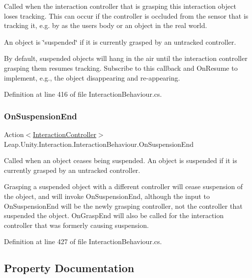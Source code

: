 Called when the interaction controller that is grasping this interaction object loses tracking. This can occur if the controller is occluded from the sensor that is tracking it, e.\+g. by as the user\textquotesingle{}s body or an object in the real world. 

An object is \char`\"{}suspended\char`\"{} if it is currently grasped by an untracked controller.

By default, suspended objects will hang in the air until the interaction controller grasping them resumes tracking. Subscribe to this callback and On\+Resume to implement, e.\+g., the object disappearing and re-\/appearing. 

Definition at line 416 of file Interaction\+Behaviour.\+cs.

\mbox{\label{class_leap_1_1_unity_1_1_interaction_1_1_interaction_behaviour_a3d34025a6b0a6f5c4160b2819aedae2d}} 
\subsubsection{\texorpdfstring{OnSuspensionEnd}{OnSuspensionEnd}}
{\footnotesize\ttfamily Action$<$\mbox{\hyperlink{class_leap_1_1_unity_1_1_interaction_1_1_interaction_controller}{Interaction\+Controller}}$>$ Leap.\+Unity.\+Interaction.\+Interaction\+Behaviour.\+On\+Suspension\+End}



Called when an object ceases being suspended. An object is suspended if it is currently grasped by an untracked controller. 

Grasping a suspended object with a different controller will cease suspension of the object, and will invoke On\+Suspension\+End, although the input to On\+Suspension\+End will be the newly grasping controller, not the controller that suspended the object. On\+Grasp\+End will also be called for the interaction controller that was formerly causing suspension. 

Definition at line 427 of file Interaction\+Behaviour.\+cs.



\subsection{Property Documentation}
\mbox{\label{class_leap_1_1_unity_1_1_interaction_1_1_interaction_behaviour_ab6d20195a414a145fcc7fcaaa6fda0f0}} 
